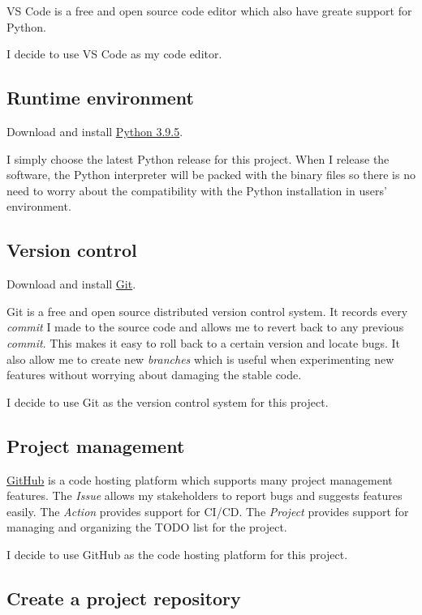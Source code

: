 \documentclass{report}
\begin{document}
VS Code is a free and open source code editor which also have greate support for Python.

I decide to use VS Code as my code editor.

\subsection{Runtime environment}

Download and install \href{https://www.python.org/downloads/}{Python 3.9.5}.

I simply choose the latest Python release for this project. When I release the software, the Python interpreter will be packed with the binary files so there is no need to worry about the compatibility with the Python installation in users' environment.

\subsection{Version control}

Download and install \href{https://git-scm.com/}{Git}.

Git is a free and open source distributed version control system. It records every \emph{commit} I made to the source code and allows me to revert back to any previous \emph{commit}. This makes it easy to roll back to a certain version and locate bugs. It also allow me to create new \emph{branches} which is useful when experimenting new features without worrying about damaging the stable code.

I decide to use Git as the version control system for this project.

\subsection{Project management}

\href{https://github.com}{GitHub} is a code hosting platform which supports many project management features. The \emph{Issue} allows my stakeholders to report bugs and suggests features easily. The \emph{Action} provides support for CI/CD. The \emph{Project} provides support for managing and organizing the TODO list for the project.

I decide to use GitHub as the code hosting platform for this project.

\subsection{Create a project repository}
\end{document}
